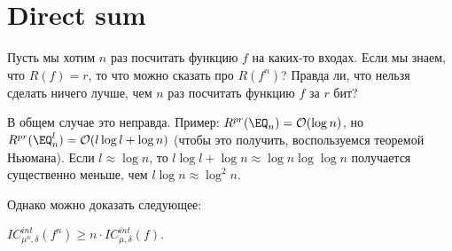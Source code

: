 \section{Direct sum}

Пусть мы хотим $n$ раз посчитать функцию $f$ на каких-то входах. Если мы знаем, что $R(f) = r$, то что можно сказать про $R(f^n)$? Правда ли, что нельзя сделать ничего лучше, чем $n$ раз посчитать функцию $f$ за $r$ бит?

В общем случае это неправда. Пример: $R^{pr}(\EQ_n) = \mathcal{O}(\log{n})$, но $R^{pr}(\EQ^l_n) = \mathcal{O}(l \log{l} + \log{n})$ (чтобы это получить, воспользуемся теоремой Ньюмана). Если $l \approx \log{n}$, то $l \log{l} + \log{n} \approx \log{n} \log{\log{n}}$ получается существенно меньше, чем $l \log{n} \approx \log^2{n}$.

Однако можно доказать следующее:

\begin{theorem}
$IC^{int}_{\mu^n, \delta}(f^n) \geq n \cdot IC^{int}_{\mu, \delta}(f)$.
\end{theorem}

